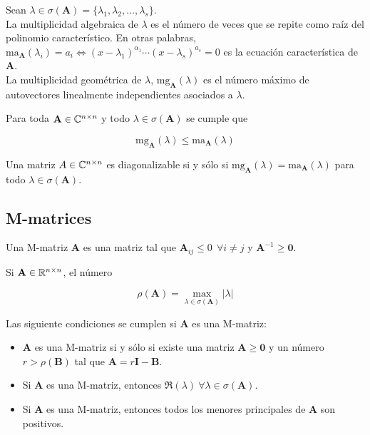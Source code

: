 \begin{defi}
Sean $\lambda \in \sigma(\mathbf{A}) = \{\lambda_1, \lambda_2, \dots, \lambda_s\}$.\\

La multiplicidad algebraica de $\lambda$ es el número de veces que se repite como raíz del polinomio característico. En otras palabras, $\mathrm{ma}_\mathbf{A}(\lambda_i) = a_i \iff (x-\lambda_1)^{\alpha_1} \cdots (x - \lambda_s)^{a_s}  = 0$ es la ecuación característica de $\mathbf{A}$.\\

La multiplicidad geométrica de $\lambda$, $\mathrm{mg}_\mathbf{A}(\lambda)$ es el número máximo de autovectores linealmente independientes asociados a $\lambda$.
\end{defi}

\begin{defi}
Para toda $\mathbf{A} \in \mathbb{C}^{n \times n}$ y todo $\lambda \in \sigma(\mathbf{A})$ se cumple que

\[ \mathrm{mg}_\mathbf{A}(\lambda) \leq \mathrm{ma}_\mathbf{A}(\lambda) \]
\end{defi}

\begin{teo}
Una matriz $A \in \mathbb{C}^{n \times n}$ es diagonalizable si y sólo si $\mathrm{mg}_\mathbf{A}(\lambda) = \mathrm{ma}_\mathbf{A}(\lambda)$ para todo $\lambda \in \sigma(\mathbf{A})$.
\end{teo}

\subsection{M-matrices} \label{sec:m_matrices}

\begin{defi}
Una M-matriz $\mathbf{A}$ es una matriz tal que $\mathbf{A}_{ij} \leq 0 \ \ \forall i \neq j$ y $\mathbf{A}^{-1} \geq \mathbf{0}$.
\end{defi}

\begin{defi}
Si $\mathbf{A} \in \mathbb{R}^{n\times n}$, el número 

\[\rho(\mathbf{A}) = \max_{\lambda \in \sigma(\mathbf{A})} |\lambda|\]
\end{defi}

\begin{prop}
Las siguiente condiciones se cumplen si $\mathbf{A}$ es una M-matriz:

\begin{itemize}
\item $\mathbf{A}$ es una M-matriz si y sólo si existe una matriz $\mathbf{A} \geq \mathbf{0}$ y un número $r > \rho(\mathbf{B})$ tal que $\mathbf{A} = r\mathbf{I} - \mathbf{B}$.
\item Si $\mathbf{A}$ es una M-matriz, entonces $\Re(\lambda) \ \forall \lambda \in \sigma(\mathbf{A})$.
\item Si $\mathbf{A}$ es una M-matriz, entonces todos los menores principales de $\mathbf{A}$ son positivos.
\end{itemize}
\end{prop}

